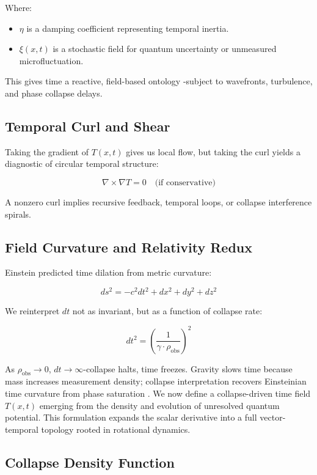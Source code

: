 Where:
\begin{itemize}
  \item $\eta$ is a damping coefficient representing temporal inertia. \item $\xi(x, t)$ is a stochastic field for quantum uncertainty or unmeasured microfluctuation. \cite{chapter_time} \end{itemize}

This gives time a  reactive, field-based ontology -subject to wavefronts, turbulence, and phase collapse delays. \cite{chapter_time} \subsection*{Temporal Curl and Shear}

Taking the gradient of $T(x, t)$ gives us local flow, but taking the curl yields a diagnostic of circular temporal structure:

\[
\nabla \times \nabla T = 0 \quad \text{(if conservative)}
\]

A nonzero curl implies recursive feedback, temporal loops, or collapse interference spirals. \cite{chapter_time} \subsection*{Field Curvature and Relativity Redux}

Einstein predicted time dilation from metric curvature:

\[
ds^2 = -c^2 dt^2 + dx^2 + dy^2 + dz^2
\]

We reinterpret $dt$ not as invariant, but as a function of collapse rate:

\[
dt^2 = \left( \frac{1}{\gamma \cdot \rho_{\text{obs}}} \right)^2
\]

As $\rho_{\text{obs}} \to 0$, $dt \to \infty$-collapse halts, time freezes. \cite{chapter_time} Gravity slows time because mass increases measurement density; collapse interpretation  recovers Einsteinian time curvature from phase saturation . \cite{chapter_time} We now define a collapse-driven time field $T(x, t)$ emerging from the density and evolution of unresolved quantum potential. \cite{chapter_time} This formulation expands the scalar derivative into a full vector-temporal topology rooted in rotational dynamics. \cite{chapter_time} \subsection*{Collapse Density Function}

